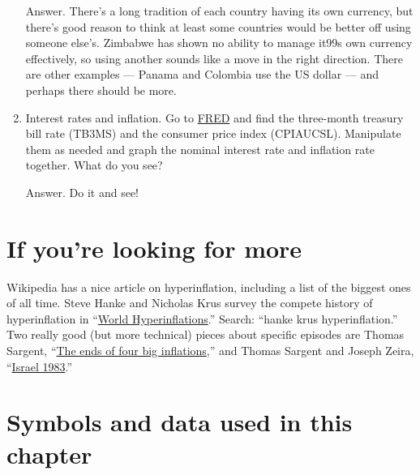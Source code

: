 \begin{enumerate}
Answer.  There's a long tradition of each country having its own currency,
but there's good reason to think at least some countries would be better
off using someone else's.
Zimbabwe has shown no ability to manage it99s own currency effectively,
so using another sounds like a move in the right direction.
There are other examples --- Panama and Colombia use the US dollar --- and perhaps there should be more.

\item Interest rates and inflation.  Go to
\href{http://research.stlouisfed.org/fred2/}{FRED} and find
the three-month treasury bill rate (TB3MS)
and the consumer price index 
 (CPIAUCSL).
Manipulate them as needed and graph
the nominal interest rate and inflation rate together.
What do you see?

Answer.  Do it and see!

\end{enumerate}
\setlength{\leftmargini}{\oldleftmargini}


\section*{If you're looking for more}

Wikipedia has a nice article on hyperinflation,
including a list of the biggest ones of all time.
%
Steve Hanke and Nicholas Krus survey the compete history of
hyperinflation in
``\href{http://www.cato.org/publications/working-paper/world-hyperinflations}{World Hyperinflations}.''
Search:  ``hanke krus hyperinflation.''
Two really good (but more technical) pieces about specific episodes are
Thomas Sargent,
``\href{http://www.nber.org/chapters/c11452.pdf}{The ends of four big inflations},''
and Thomas Sargent and Joseph Zeira,
``\href{http://www.sciencedirect.com/science/article/pii/S1094202511000147}
{Israel 1983}.''


\section*{Symbols and data used in this chapter}

